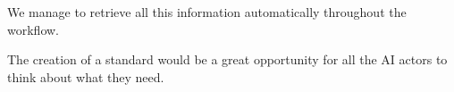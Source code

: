 We manage to retrieve all this information automatically throughout the workflow.

The creation of a standard
would be a great opportunity for all the AI actors to think about what they
need.


%
%
%



